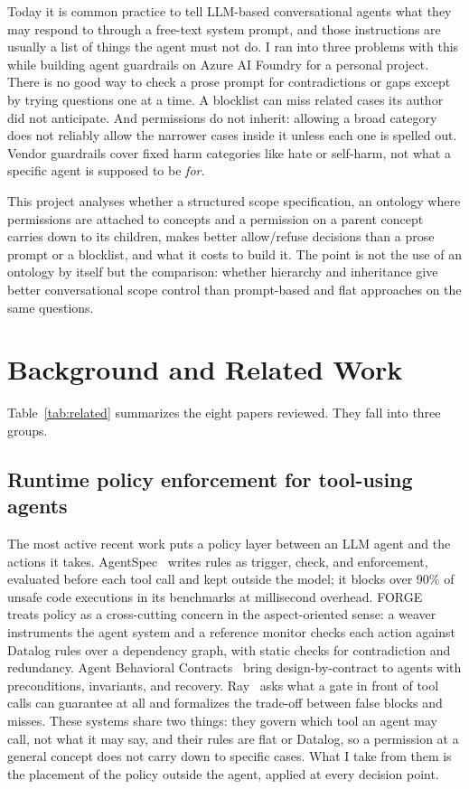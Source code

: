 \documentclass[conference]{IEEEtran}
\begin{document}
Today it is common practice to tell LLM-based conversational agents what they may respond to through a free-text system prompt, and those instructions are usually a list of things the agent must not do. I ran into three problems with this while building agent guardrails on Azure AI Foundry for a personal project. There is no good way to check a prose prompt for contradictions or gaps except by trying questions one at a time. A blocklist can miss related cases its author did not anticipate. And permissions do not inherit: allowing a broad category does not reliably allow the narrower cases inside it unless each one is spelled out. Vendor guardrails cover fixed harm categories like hate or self-harm, not what a specific agent is supposed to be \emph{for}.

This project analyses whether a structured scope specification, an ontology where permissions are attached to concepts and a permission on a parent concept carries down to its children, makes better allow/refuse decisions than a prose prompt or a blocklist, and what it costs to build it. The point is not the use of an ontology by itself but the comparison: whether hierarchy and inheritance give better conversational scope control than prompt-based and flat approaches on the same questions.

\section{Background and Related Work}

Table~\ref{tab:related} summarizes the eight papers reviewed. They fall into three groups.

\subsection{Runtime policy enforcement for tool-using agents}
The most active recent work puts a policy layer between an LLM agent and the actions it takes. AgentSpec~\cite{agentspec} writes rules as trigger, check, and enforcement, evaluated before each tool call and kept outside the model; it blocks over 90\% of unsafe code executions in its benchmarks at millisecond overhead. FORGE~\cite{forge} treats policy as a cross-cutting concern in the aspect-oriented sense: a weaver instruments the agent system and a reference monitor checks each action against Datalog rules over a dependency graph, with static checks for contradiction and redundancy. Agent Behavioral Contracts~\cite{abc} bring design-by-contract to agents with preconditions, invariants, and recovery. Ray~\cite{ray2026} asks what a gate in front of tool calls can guarantee at all and formalizes the trade-off between false blocks and misses. These systems share two things: they govern which tool an agent may call, not what it may say, and their rules are flat or Datalog, so a permission at a general concept does not carry down to specific cases. What I take from them is the placement of the policy outside the agent, applied at every decision point.
\end{document}
